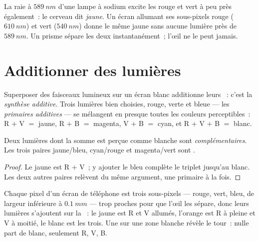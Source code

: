 \begin{example}\label{ex:g11:color-light-sources:yellows}
La raie à $\qty{589}{nm}$ d'une lampe à sodium excite les
 rouge et vert à peu près également~: le
cerveau dit \emph{jaune}. Un écran allumant ses sous-pixels rouge
($\qty{610}{nm}$) et vert ($\qty{540}{nm}$) donne le même jaune sans
aucune lumière près de $\qty{589}{nm}$. Un prisme sépare les deux
instantanément~; l'œil ne le peut jamais.
\end{example}

\section{Additionner des lumières}

\begin{definition}\label{def:g11:color-light-sources:additive}
Superposer des faisceaux lumineux sur un écran blanc additionne leurs
~: c'est la \emph{synthèse additive}.
Trois lumières bien choisies, rouge, verte et bleue --- les
\emph{primaires additives} --- se mélangent
en presque toutes les couleurs perceptibles~: R $+$ V $=$ jaune,
R $+$ B $=$ magenta, V $+$ B $=$ cyan, et R $+$ V $+$ B $=$ blanc.
\end{definition}

\begin{proposition}\label{prop:g11:color-light-sources:complementary}
Deux lumières dont la somme est perçue comme blanche sont
\emph{complémentaires}. Les trois
paires jaune/bleu, cyan/rouge et magenta/vert sont .
\end{proposition}

\begin{proof}
Le jaune est R $+$ V~; y ajouter le bleu complète le triplet jusqu'au
blanc. Les deux autres paires relèvent du même argument, une primaire
à la fois.
\end{proof}

\begin{example}[Écrans]\label{ex:g11:color-light-sources:screen}
Chaque pixel d'un écran de téléphone est trois sous-pixels --- rouge,
vert, bleu, de largeur inférieure à $\qty{0.1}{mm}$ --- trop proches
pour que l'œil les sépare, donc leurs lumières s'ajoutent sur la
~: le jaune est R et V allumés, l'orange est R à
pleine  et V à moitié, le blanc est les
trois. Une  sur une zone blanche révèle le tour~: nulle part de
blanc, seulement R, V, B.
\end{example}


